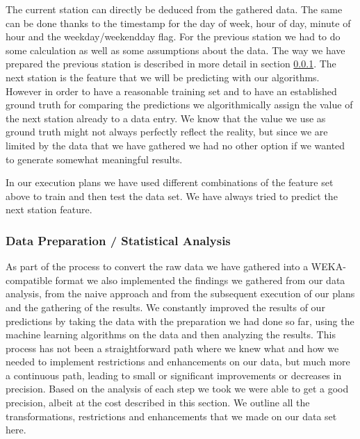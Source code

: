 The current station can directly be deduced from the gathered data. The same can be done thanks to the timestamp for the day of week, hour of day, minute of hour and the weekday/weekendday flag. For the previous station we had to do some calculation as well as some assumptions about the data. The way we have prepared the previous station is described in more detail in section \ref{subsubsec:data_preparation}. The next station is the feature that we will be predicting with our algorithms. However in order to have a reasonable training set and to have an established ground truth for comparing the predictions we algorithmically assign the value of the next station already to a data entry. We know that the value we use as ground truth might not always perfectly reflect the reality, but since we are limited by the data that we have gathered we had no other option if we wanted to generate somewhat meaningful results.

In our execution plans we have used different combinations of the feature set above to train and then test the data set. We have always tried to predict the next station feature.


\subsubsection{Data Preparation / Statistical Analysis}
\label{subsubsec:data_preparation}
As part of the process to convert the raw data we have gathered into a WEKA-compatible format we also implemented the findings we gathered from our data analysis, from the naive approach and from the subsequent execution of our plans and the gathering of the results. We constantly improved the results of our predictions by taking the data with the preparation we had done so far, using the machine learning algorithms on the data and then analyzing the results. This process has not been a straightforward path where we knew what and how we needed to implement restrictions and enhancements on our data, but much more a continuous path, leading to small or significant improvements or decreases in precision. Based on the analysis of each step we took we were able to get a good precision, albeit at the cost described in this section. We outline all the transformations, restrictions and enhancements that we made on our data set here.

